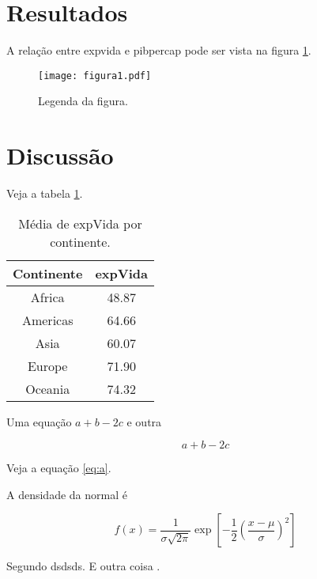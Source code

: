 \documentclass[a4paper]{article}
\begin{document}
\section{Resultados}

A relação entre expvida e pibpercap pode ser vista na figura \ref{fig:plot}.

\begin{figure}[h]
\centering
\texttt{[image: figura1.pdf]}
\caption{Legenda da figura.}
\label{fig:plot}
\end{figure}

\section{Discussão}

Veja a tabela \ref{tab:medias}.

\begin{table}[h]
\caption{Média de expVida por continente.}
\label{tab:medias}
\centering
\begin{tabular}{cc}
\hline
Continente & expVida \\
\hline
Africa & 48.87 \\
Americas & 64.66 \\
Asia & 60.07 \\
Europe & 71.90 \\
Oceania & 74.32 \\
\hline
\end{tabular}
\end{table}

Uma equação $a+b-2c$ e outra

\begin{equation}
\label{eq:a}
a+b-2c
\end{equation}

Veja a equação \ref{eq:a}.

A densidade da normal é

\begin{equation}
f(x) = \frac{1}{\sigma \sqrt{2\pi}} \exp{ \left[ -\frac{1}{2}
    \left( \frac{x - \mu}{\sigma} \right)^2 \right] }
\end{equation}


Segundo \citet{Buckland2004} dsdsds. E outra coisa \citep{Durbin1997}.



\end{document}

